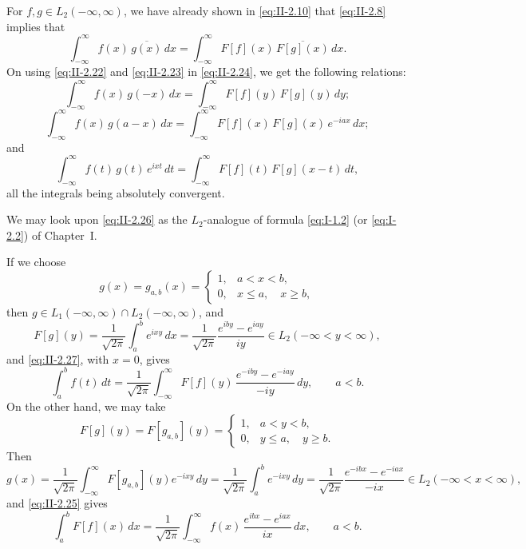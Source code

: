 For $f,g\in L_{2}(-\infty,\infty)$, we have already shown in \eqref{eq:II-2.10} that \eqref{eq:II-2.8} implies that
\begin{equation}\tag{2.24}\label{eq:II-2.24}
\int_{-\infty}^{\infty}f(x)\,\overline{g(x)}\,dx
=\int_{-\infty}^{\infty}F[f](x)\,\overline{F[g](x)}\,dx.
\end{equation}
On using \eqref{eq:II-2.22} and \eqref{eq:II-2.23} in \eqref{eq:II-2.24}, we get the following relations:
\begin{equation}\tag{2.25}\label{eq:II-2.25}
\int_{-\infty}^{\infty}f(x)\,g(-x)\,dx
=\int_{-\infty}^{\infty}F[f](y)\,F[g](y)\,dy;
\end{equation}
\begin{equation}\tag{2.26}\label{eq:II-2.26}
\int_{-\infty}^{\infty}f(x)\,g(a-x)\,dx
=\int_{-\infty}^{\infty}F[f](x)\,F[g](x)\,e^{-iax}\,dx;
\end{equation}
and
\begin{equation}\tag{2.27}\label{eq:II-2.27}
\int_{-\infty}^{\infty}f(t)\,g(t)\,e^{ixt}\,dt
=\int_{-\infty}^{\infty}F[f](t)\,F[g](x-t)\,dt,
\end{equation}
all the integrals being absolutely convergent.

We may look upon \eqref{eq:II-2.26} as the $L_{2}$-analogue of formula \eqref{eq:I-1.2} (or \eqref{eq:I-2.2}) of Chapter~I.

If we choose
\[
g(x)=g_{a,b}(x)=
\begin{cases}
1, & a<x<b,\\
0, & x\le a,\quad x\ge b,
\end{cases}
\]
then $g\in L_{1}(-\infty,\infty)\cap L_{2}(-\infty,\infty)$, and
\[
F[g](y)=\frac{1}{\sqrt{2\pi}}\int_{a}^{b}e^{ixy}\,dx
=\frac{1}{\sqrt{2\pi}}\frac{e^{iby}-e^{iay}}{iy}\in L_{2}(-\infty<y<\infty),
\]
and \eqref{eq:II-2.27}, with $x=0$, gives
\begin{equation}\tag{2.28}\label{eq:II-2.28}
\int_{a}^{b}f(t)\,dt
=\frac{1}{\sqrt{2\pi}}\int_{-\infty}^{\infty}F[f](y)\,\frac{e^{-iby}-e^{-iay}}{-iy}\,dy,\qquad a<b.
\end{equation}
On the other hand, we may take
\[
F[g](y)=F[g_{a,b}](y)=
\begin{cases}
1, & a<y<b,\\
0, & y\le a,\quad y\ge b.
\end{cases}
\]
Then
\[
g(x)=\frac{1}{\sqrt{2\pi}}\int_{-\infty}^{\infty}F[g_{a,b}](y)e^{-ixy}\,dy
=\frac{1}{\sqrt{2\pi}}\int_{a}^{b}e^{-ixy}\,dy
=\frac{1}{\sqrt{2\pi}}\frac{e^{-ibx}-e^{-iax}}{-ix}\in L_{2}(-\infty<x<\infty),
\]
and \eqref{eq:II-2.25} gives
\begin{equation}\tag{2.29}\label{eq:II-2.29}
\int_{a}^{b}F[f](x)\,dx
=\frac{1}{\sqrt{2\pi}}\int_{-\infty}^{\infty}f(x)\,\frac{e^{ibx}-e^{iax}}{ix}\,dx,\qquad a<b.
\end{equation}

